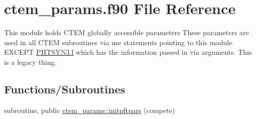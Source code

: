 \hypertarget{ctem__params_8f90}{}\section{ctem\+\_\+params.\+f90 File Reference}
\label{ctem__params_8f90}


This module holds C\+T\+E\+M globally accessible parameters These parameters are used in all C\+T\+E\+M subroutines via use statements pointing to this module E\+X\+C\+E\+P\+T \hyperlink{PHTSYN3_8f}{P\+H\+T\+S\+Y\+N3.\+f} which has the information passed in via arguments. This is a legacy thing.  


\subsection*{Functions/\+Subroutines}
{\bf }\par
\begin{DoxyCompactItemize}
\item 
subroutine, public \hyperlink{group__ctem__params__initpftpars_ga766b01bfb91b339c953fe72266c10aaf}{ctem\+\_\+params\+::initpftpars} (compete)
\end{DoxyCompactItemize}

